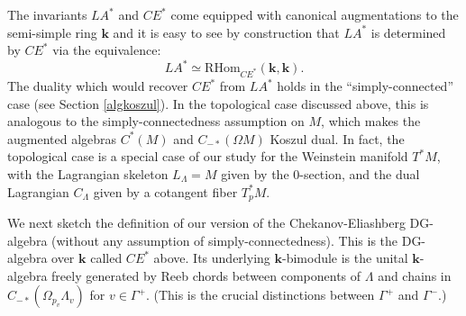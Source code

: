 \documentclass{gtpart}
\renewcommand{\k}{\mathbf{k}}
\begin{document}
The invariants $LA^*$ and $CE^*$ come equipped with canonical augmentations to the semi-simple ring
$\k$ and it is easy to see by construction that $LA^*$ is determined by $CE^*$ via the equivalence:
\[ LA^* \simeq \mathrm{RHom}_{CE^*} (\k, \k). \]
The duality which would recover $CE^{\ast}$ from $LA^{\ast}$ holds in the ``simply-connected'' case (see Section \ref{algkoszul}). In the topological case discussed above, this is analogous to the
simply-connectedness assumption on $M$, which makes the augmented algebras $C^*(M)$ and
$C_{-*}(\Omega M)$ Koszul dual. In fact, the topological case is a special case of our study for
the Weinstein manifold $T^*M$, with the Lagrangian skeleton $L_\Lambda = M$ given by the
0-section, and the dual Lagrangian $C_\Lambda$ given by a cotangent fiber $T^*_{p} M$.

We next sketch the definition of our version of the Chekanov-Eliashberg DG-algebra
(without any assumption of simply-connectedness). This is the DG-algebra over $\k$ called
$CE^*$ above. Its underlying $\k$-bimodule is the unital $\k$-algebra freely generated by Reeb chords between components of
$\Lambda$ and chains in $C_{-*}(\Omega_{p_v} \Lambda_v)$ for $v \in \Gamma^+$. (This is the crucial distinctions between $\Gamma^+$ and $\Gamma^-$.)
\end{document}
